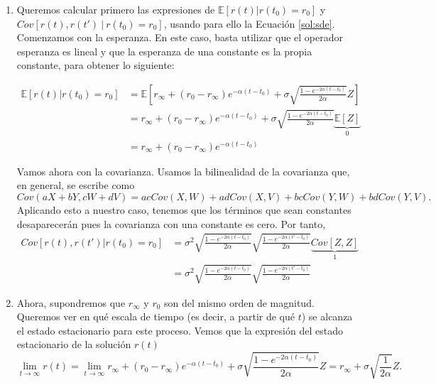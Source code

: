 \documentclass[a4paper]{article}
\begin{document}
\begin{enumerate}[label=(\alph*)]
  \item \label{2:a} Queremos calcular primero las expresiones de $\mathbb E[r(t)|r(t_{0}) = r_{0}]$ y $Cov[r(t),r(t') \ | \ r(t_{0})= r_{0}]$, usando para ello la Ecuación \eqref{sol:sde}. Comenzamos con la esperanza. En este caso, basta utilizar que el operador esperanza es lineal y que la esperanza de una constante es la propia constante, para obtener lo siguiente:

        \begin{align*}
         \mathbb E[r(t)|r(t_{0}) = r_{0}] & = \mathbb E\left[ r_{\infty} + (r_{0} - r_{\infty})e^{-\alpha(t-t_{0})} + \sigma \sqrt{\frac{1 - e^{-2\alpha(t-t_{0})}}{2\alpha}}Z\right] \\
                         & =  r_{\infty} + (r_{0} - r_{\infty})e^{-\alpha(t-t_{0})} + \sigma \sqrt{\frac{1 - e^{-2\alpha(t-t_{0})}}{2\alpha}} \underbrace{\mathbb E[Z]}_{0} \\
          & = r_{\infty} + (r_{0} - r_{\infty})e^{-\alpha(t-t_{0})}
        \end{align*}

        Vamos ahora con la covarianza. Usamos la bilinealidad de la covarianza que, en general, se escribe como
        \[
        Cov(aX+bY, cW + dV) = acCov(X,W) + adCov(X,V) + bcCov(Y,W) + bdCov(Y,V).
        \]
        Aplicando esto a nuestro caso, tenemos que los términos que sean constantes desaparecerán pues la covarianza con una constante es cero. Por tanto,
        \begin{align*}
          Cov[r(t), r(t')|r(t_{0}) = r_{0}] & = \sigma^{2}\sqrt{\frac{1- e^{-2\alpha (t-t_{0})}}{2\alpha}}\sqrt{\frac{1- e^{-2\alpha (t'-t_{0})}}{2\alpha}}\underbrace{Cov\left[Z,Z\right]}_{1} \\
          & =  \sigma^{2}\sqrt{\frac{1- e^{-2\alpha (t-t_{0})}}{2\alpha}}\sqrt{\frac{1- e^{-2\alpha (t'-t_{0})}}{2\alpha}}
        \end{align*}

  \item \label{2:c} Ahora, supondremos que $r_{\infty}$ y $r_{0}$ son del mismo orden de magnitud. Queremos ver en qué escala de tiempo (es decir, a partir de qué $t$) se alcanza el estado estacionario para este proceso. Vemos que la expresión del estado estacionario de la solución $r(t)$
        \[
        \lim_{t \to \infty} r(t) = \lim_{t \to \infty}  r_{\infty} + (r_{0} - r_{\infty})e^{-\alpha(t-t_{0})} + \sigma \sqrt{\frac{1 - e^{-2\alpha(t-t_{0})}}{2\alpha}}Z = r_{\infty} +  \sigma \sqrt{\frac{1}{2\alpha}}Z.
        \]


\end{enumerate}
\end{document}
